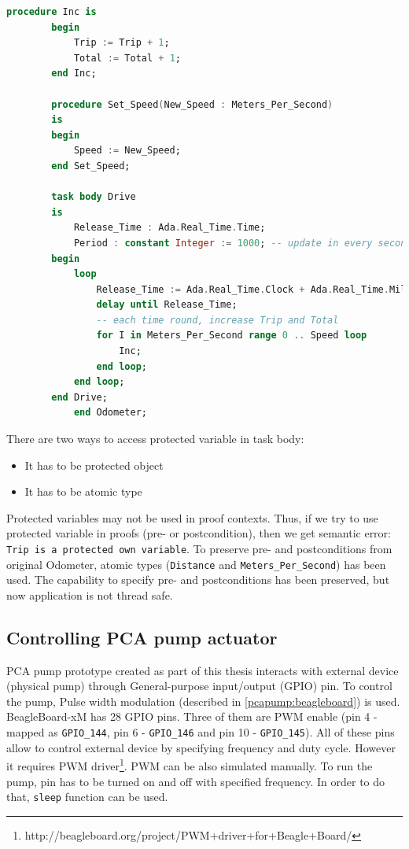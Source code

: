 \begin{lstlisting}[language=ada, frame=single, gobble=0, caption={Multitasking Odometer}, label={listing:Odometer2005Tasking}]
	    procedure Inc is
	    begin
	        Trip := Trip + 1;
	        Total := Total + 1;
	    end Inc;
	    
	    procedure Set_Speed(New_Speed : Meters_Per_Second)
	    is
	    begin
	        Speed := New_Speed;
	    end Set_Speed;    
	    
	    task body Drive
	    is
	        Release_Time : Ada.Real_Time.Time;
	        Period : constant Integer := 1000; -- update in every second
	    begin
	        loop
	            Release_Time := Ada.Real_Time.Clock + Ada.Real_Time.Milliseconds(Period);
	            delay until Release_Time;
	            -- each time round, increase Trip and Total
	            for I in Meters_Per_Second range 0 .. Speed loop
	                Inc;
	            end loop;            
	        end loop;
	    end Drive;
	    	end Odometer;
\end{lstlisting} 

There are two ways to access protected variable in task body:
\begin{itemize}
    \item It has to be protected object
    \item It has to be atomic type
\end{itemize}

Protected variables may not be used in proof contexts. Thus, if we try to use protected variable in proofs (pre- or postcondition), then we get semantic error: \lstinline{Trip is a protected own variable}. To preserve pre- and postconditions from original Odometer, atomic types (\lstinline{Distance} and \lstinline{Meters_Per_Second}) has been used. The capability to specify pre- and postconditions has been preserved, but now application is not thread safe.


\subsection{Controlling PCA pump actuator}
\label{pcapumpimpl:beagleboard:pcapumpmotor}

PCA pump prototype created as part of this thesis interacts with external device (physical pump) through General-purpose input/output (GPIO) pin. To control the pump, Pulse width modulation (described in \ref{pcapump:beagleboard}) is used. BeagleBoard-xM has 28 GPIO pins. Three of them are PWM enable (pin 4 - mapped as \lstinline{GPIO_144}, pin 6 - \lstinline{GPIO_146} and pin 10 - \lstinline{GPIO_145}). All of these pins allow to control external device by specifying frequency and duty cycle. However it requires PWM driver\footnote{http://beagleboard.org/project/PWM+driver+for+Beagle+Board/}. PWM can be also simulated manually. To run the pump, pin has to be turned on and off with specified frequency. In order to do that, \lstinline{sleep} function can be used. 

